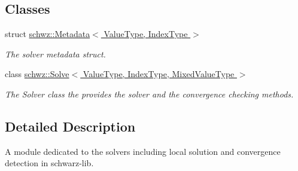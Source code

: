 \subsection*{Classes}
\begin{DoxyCompactItemize}
\item 
struct \hyperlink{structschwz_1_1Metadata}{schwz\+::\+Metadata$<$ Value\+Type, Index\+Type $>$}
\begin{DoxyCompactList}\small\item\em The solver metadata struct. \end{DoxyCompactList}\item 
class \hyperlink{classschwz_1_1Solve}{schwz\+::\+Solve$<$ Value\+Type, Index\+Type, Mixed\+Value\+Type $>$}
\begin{DoxyCompactList}\small\item\em The Solver class the provides the solver and the convergence checking methods. \end{DoxyCompactList}\end{DoxyCompactItemize}


\subsection{Detailed Description}
A module dedicated to the solvers including local solution and convergence detection in schwarz-\/lib. 

